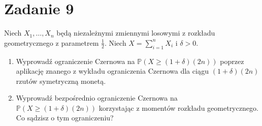 \section[\nierozwiazane{Zadanie 9}]{Zadanie 9}
Niech \(X_1, \ldots, X_n\) będą niezależnymi zmiennymi losowymi z rozkładu geometrycznego
z parametrem \(\frac{1}{2}\). Niech \(X = \sum_{i=1}^n X_i\) i \(\delta > 0\).
\begin{enumerate}
	\item[(i)] Wyprowadź ograniczenie Czernowa na \(\mathbb{P}(X \geqslant (1+\delta)(2n))\) poprzez aplikację znanego
	      z wykładu ograniczenia Czernowa dla ciągu \((1+\delta)(2n)\) rzutów symetryczną monetą.
	\item[(ii)] Wyprowadź bezpośrednio ograniczenie Czernowa na \(\mathbb{P}(X \geqslant (1+\delta)(2n))\) korzystając
	      z momentów rozkładu geometrycznego. Co sądzisz o tym ograniczeniu?
\end{enumerate}

\brakrozwiazania
